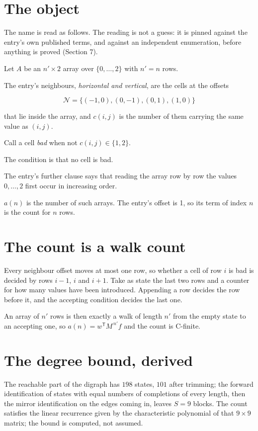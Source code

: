\documentclass[11pt]{article}
\theoremstyle{definition}
\begin{document}
\section{The object}

The name is read as follows. The reading is not a guess: it is pinned against the entry's own published terms, and against an independent enumeration, before anything is proved (Section 7).

Let $A$ be an $n' \times 2$ array over $\{0,\dots,2\}$ with $n' = n$ rows.

The entry's neighbours, {\itshape horizontal and vertical}, are the cells at the offsets

\[\mathcal{N} = \{(-1,0), (0,-1), (0,1), (1,0)\}\]

that lie inside the array, and $c(i,j)$ is the number of them carrying the same value as $(i,j)$.

Call a cell {\itshape bad} when not $c(i,j) \in \{1, 2\}$.

The condition is that no cell is bad.

The entry's further clause says that reading the array row by row the values $0,\dots,2$ first occur in increasing order.

$a(n)$ is the number of such arrays. The entry's offset is 1, so its term of index $n$ is the count for $n$ rows.

\section{The count is a walk count}

Every neighbour offset moves at most one row, so whether a cell of row $i$ is bad is decided by rows $i-1$, $i$ and $i+1$. Take as state the last two rows and a counter for how many values have been introduced. Appending a row decides the row before it, and the accepting condition decides the last one.

An array of $n'$ rows is then exactly a walk of length $n'$ from the empty state to an accepting one, so $a(n) = w^{\mathsf T}M^{\,n'}f$ and the count is C-finite.

\section{The degree bound, derived}

The reachable part of the digraph has $198$ states, $101$ after trimming; the forward identification of states with equal numbers of completions of every length, then the mirror identification on the edges coming in, leaves $S = 9$ blocks. The count satisfies the linear recurrence given by the characteristic polynomial of that $9\times9$ matrix; the bound is computed, not assumed.
\end{document}
